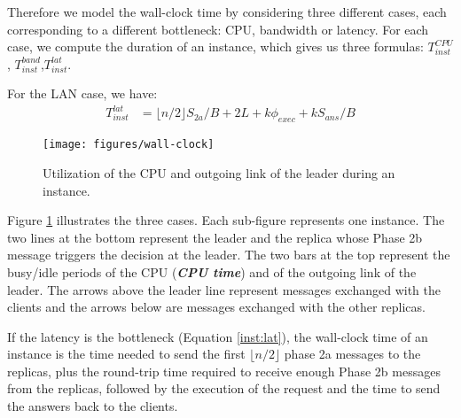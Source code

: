 \documentclass[10pt,preprint]{sigplanconf}
\begin{document}
Therefore we model the wall-clock time by considering three different cases, each corresponding to a different bottleneck: CPU, bandwidth or latency. For each case, we compute the duration of an instance, which gives us three formulas: $T^{CPU}_{inst}$, $T^{band}_{inst}$,$T^{lat}_{inst}$.

For the LAN case, we have:
\begin{align}
T^{lat}_{inst} &= \lfloor n/2 \rfloor S_{2a}/B + 2L + k\phi_{exec} + kS_{ans}/B \label{inst:lat}
%
%

\end{align}

\begin{figure}
\begin{center}
\texttt{[image: figures/wall-clock]}
\end{center}
\caption{Utilization of the CPU and outgoing link of the leader during an instance.}
\label{fig:inst}
\end{figure}

Figure \ref{fig:inst} illustrates the three cases. Each sub-figure represents one instance. The two lines at the bottom represent the leader and the replica whose Phase 2b message triggers the decision at the leader. The two bars at the top represent the busy/idle periods of the CPU (\textbf{\emph{CPU time}}) and of the outgoing link of the leader. The arrows above the leader line represent messages exchanged with the clients and the arrows below are messages exchanged with the other replicas.

If the latency is the bottleneck (Equation \eqref{inst:lat}), the wall-clock time of an instance is the time needed to send the first $\lfloor n/2 \rfloor$ phase 2a messages to the replicas, plus the round-trip time required to receive enough Phase 2b messages from the replicas, followed by the execution of the request and the time to send the answers back to the clients.


% 
\end{document}
